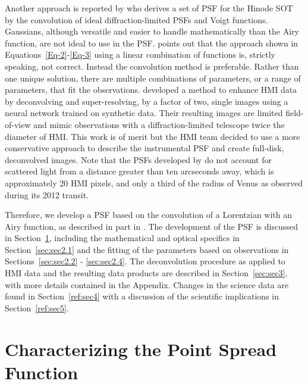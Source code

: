 \documentclass[trackchanges]{aastex62}
\begin{document}
Another approach is reported by \citet{wedemeyer:2008} who derives a set of PSF for the Hinode SOT by the convolution of ideal diffraction-limited PSFs and Voigt functions. Gaussians, although versatile and easier to handle mathematically than the Airy function, are not ideal to use in the PSF.  \citet{wedemeyer:2008} points out that the approach shown in Equations~\ref{Eq-2}-\ref{Eq-3} using a linear combination of functions is, strictly speaking, not correct. Instead the convolution method is preferable. Rather than one unique solution, there are multiple combinations of parameters, or a range of parameters, that fit the observations.  \citet{diazbaso:2018} developed a method to enhance HMI data by deconvolving and super-resolving, by a factor of two, single images using a neural network trained on synthetic data. Their resulting images are limited field-of-view and mimic observations with a diffraction-limited telescope twice the diameter of HMI. This work is of merit but the HMI team decided to use a more conservative approach to describe the instrumental PSF and create full-disk, deconvolved images. Note that the PSFs developed by \citet{wedemeyer:2008, yeo:2014, diazbaso:2018} do not account for scattered light from a distance greater than ten arcseconds away, which is approximately 20 HMI pixels, and only a third of the radius of Venus as observed during its 2012 transit.  

Therefore, we develop a PSF based on the convolution of a Lorentzian with an Airy function, as described in part in \citet{couvidat:2016}. The development of the PSF is discussed in Section~\ref{sec:sec2}, including the mathematical and optical specifics in Section~\ref{sec:sec2.1} and the fitting of the parameters based on observations in Sections~\ref{sec:sec2.2} - \ref{sec:sec2.4}.  The deconvolution procedure as applied to HMI data and the resulting data products are described in Section~\ref{sec:sec3}, with more details contained in the Appendix.  Changes in the science data are found in Section~\ref{ref:sec4} with a discussion of the scientific implications in Section~\ref{ref:sec5}. 

\section{Characterizing the Point Spread Function} \label{sec:sec2}
\end{document}
